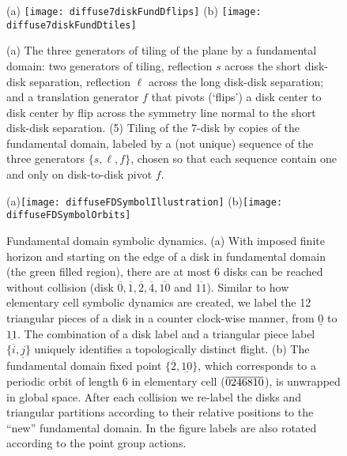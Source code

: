 \documentclass[aps,pre,
                showpacs,
                twocolumn,
                groupedaddress,
                floatfix]{revtex4-1}
\begin{document}
\begin{figure}[htbp]
  \begin{center}
    (a) \texttt{[image: diffuse7diskFundDflips]}
    (b) \texttt{[image: diffuse7diskFundDtiles]}
  \end{center}
  \caption{\label{fig-7diskFundDflips} (a) The three generators of tiling of the  plane by a fundamental domain: two generators of  tiling, reflection  $s$ across the short disk-disk separation, reflection $\ell$ across the long  disk-disk separation; and a translation generator $f$ that pivots (`flips') a  disk center to disk center by flip across the symmetry line normal to the  short disk-disk separation. (5) Tiling of the 7-disk by copies of the  fundamental domain, labeled by a (not unique) sequence of the three generators  $\{s,\ell,f\}$, chosen so that each sequence contain one and only on  disk-to-disk pivot $f$. }
\end{figure}

\begin{figure}[htbp]
  (a)\texttt{[image: diffuseFDSymbolIllustration]}
  (b)\texttt{[image: diffuseFDSymbolOrbits]}

  \caption{\label{fig-fdflights} Fundamental domain symbolic dynamics. (a) With  imposed finite horizon and starting on the edge of a disk in fundamental  domain (the green filled region), there are at most 6 disks can be reached  without collision (disk  $\overline{0},\overline{1},\overline{2},\overline{4},\overline{10}$ and  $\overline{11}$). Similar to how elementary cell symbolic dynamics are  created, we label the 12 triangular pieces of a disk in a counter clock-wise  manner, from $\underline{0}$ to $\underline{11}$. The combination of a disk  label and a triangular piece label $\{\overline{i},\underline{j}\}$ uniquely  identifies a topologically distinct flight. (b) The fundamental domain fixed   point $\{\overline{2},\underline{10}\}$, which corresponds to a periodic   orbit of length 6 in elementary cell (${\overline{0246810}}$), is unwrapped in   global space. After each collision we re-label the disks and triangular   partitions according to their relative positions to the ``new'' fundamental   domain. In the figure labels are also rotated according to the point   group actions.}
\end{figure}
\end{document}
